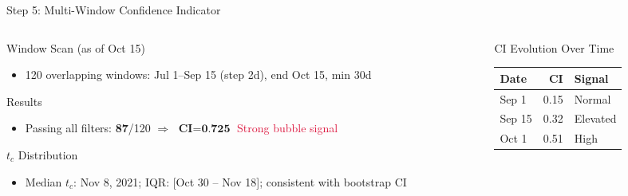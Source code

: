\documentclass[9pt, aspectratio=169, t]{beamer}
\begin{document}
\begin{frame}{Step 5: Multi-Window Confidence Indicator}
    \begin{cminipage}{0.95\textwidth}
    {\scriptsize
    \begin{columns}[T]
        \begin{column}{0.47\textwidth}
            \begin{block}{Window Scan (as of Oct 15)}
                \begin{itemize}\setlength{\itemsep}{0pt}
                    \item 120 overlapping windows: Jul 1--Sep 15 (step 2d), end Oct 15, min 30d
                \end{itemize}
            \end{block}
            \vspace{-2mm}
            \begin{alertblock}{Results}
                \begin{itemize}\setlength{\itemsep}{0pt}
                    \item Passing all filters: \textbf{87}/120 $\Rightarrow$ $\textbf{CI} = \textbf{0.725}$ \textcolor{Crimson}{Strong bubble signal}
                \end{itemize}
            \end{alertblock}
            \vspace{-2mm}
            \begin{exampleblock}{$t_c$ Distribution}
                \begin{itemize}\setlength{\itemsep}{0pt}
                    \item Median $t_c$: Nov 8, 2021; IQR: [Oct 30 -- Nov 18]; consistent with bootstrap CI
                \end{itemize}
            \end{exampleblock}
        \end{column}
        \begin{column}{0.47\textwidth}
            \begin{block}{CI Evolution Over Time}
                {\scriptsize
                \begin{tabular}{lrl}
                    \toprule
                    \textbf{Date} & \textbf{CI} & \textbf{Signal} \\
                    \midrule
                    Sep 1 & 0.15 & Normal \\
                    Sep 15 & 0.32 & Elevated \\
                    Oct 1 & 0.51 & \textcolor{Amber}{High} \\

\end{tabular}}
\end{block}
\end{column}
\end{columns}}
\end{cminipage}
\end{frame}
\end{document}
